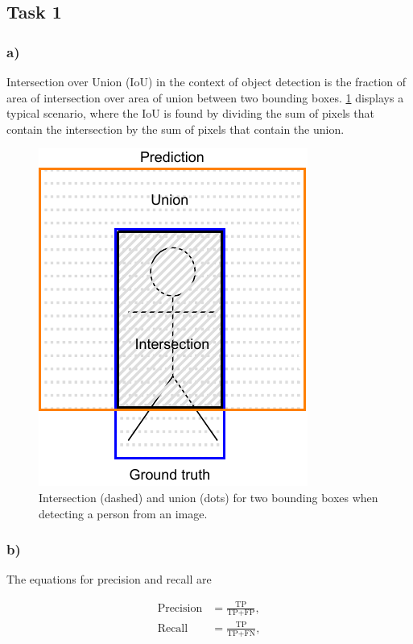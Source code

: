 \subsection*{Task 1}

\subsubsection*{a)}

Intersection over Union (IoU) in the context of object detection is the fraction of area of intersection over area of union between two bounding boxes. \cref{fig:task1:a} displays a typical scenario, where the IoU is found by dividing the sum of pixels that contain the intersection by the sum of pixels that contain the union.

\begin{figure}[h!]
  \centering
  \includegraphics{figures/IoU.pdf}
  \caption{Intersection (dashed) and union (dots) for two bounding boxes when detecting a person from an image.}
  \label{fig:task1:a}
\end{figure}


\subsubsection*{b)}

The equations for precision and recall are

\begin{subequations}
  \begin{align*}
    \text{Precision} &= \frac{\text{TP}}{\text{TP}+\text{FP}}, \\
    \text{Recall} &= \frac{\text{TP}}{\text{TP}+\text{FN}},
  \end{align*}
\end{subequations}

